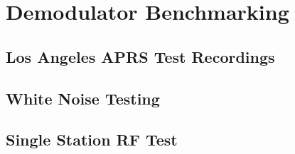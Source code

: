 \chapter{Demodulator Benchmarking}

\section{Los Angeles APRS Test Recordings}

\section{White Noise Testing}

\section{Single Station RF Test}
